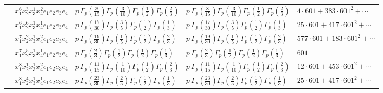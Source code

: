 \documentclass[11pt]{article}
\begin{document}
\begin{table}[ht]
{\begin{tabular}{@{}lllll@{}}
 & $x_{1}^{6} x_{2}^{3} x_{3}^{1} x_{4}^{2}  e_{1} e_{2} e_{3} e_{4}$ & $p \, \Gamma_p \left( \frac{8}{15} \right) \Gamma_p \left( \frac{3}{10} \right) \Gamma_p \left( \frac{1}{2} \right) \Gamma_p \left( \frac{2}{3} \right)$ & $p \, \Gamma_p \left( \frac{8}{15} \right) \Gamma_p \left( \frac{3}{10} \right) \Gamma_p \left( \frac{1}{2} \right) \Gamma_p \left( \frac{2}{3} \right)$ & $4{\cdot}601{+}383{\cdot}601^{2}{+}\cdots$ \\
 & $x_{1}^{6} x_{2}^{6} x_{3}^{1} x_{4}^{1}  e_{1} e_{2} e_{3} e_{4}$ & $p \, \Gamma_p \left( \frac{17}{30} \right) \Gamma_p \left( \frac{3}{5} \right) \Gamma_p \left( \frac{1}{2} \right) \Gamma_p \left( \frac{1}{3} \right)$ & $p \, \Gamma_p \left( \frac{17}{30} \right) \Gamma_p \left( \frac{3}{5} \right) \Gamma_p \left( \frac{1}{2} \right) \Gamma_p \left( \frac{1}{3} \right)$ & $25{\cdot}601{+}417{\cdot}601^{2}{+}\cdots$ \\
 & $x_{1}^{7} x_{2}^{2} x_{3}^{1} x_{4}^{2}  e_{1} e_{2} e_{3} e_{4}$ & $p \, \Gamma_p \left( \frac{19}{30} \right) \Gamma_p \left( \frac{1}{5} \right) \Gamma_p \left( \frac{1}{2} \right) \Gamma_p \left( \frac{2}{3} \right)$ & $p \, \Gamma_p \left( \frac{19}{30} \right) \Gamma_p \left( \frac{1}{5} \right) \Gamma_p \left( \frac{1}{2} \right) \Gamma_p \left( \frac{2}{3} \right)$ & $577{\cdot}601{+}183{\cdot}601^{2}{+}\cdots$ \\
 & $x_{1}^{7} x_{2}^{5} x_{3}^{1} x_{4}^{1}  e_{1} e_{2} e_{3} e_{4}$ & $p \, \Gamma_p \left( \frac{2}{3} \right) \Gamma_p \left( \frac{1}{2} \right) \Gamma_p \left( \frac{1}{2} \right) \Gamma_p \left( \frac{1}{3} \right)$ & $p \, \Gamma_p \left( \frac{2}{3} \right) \Gamma_p \left( \frac{1}{2} \right) \Gamma_p \left( \frac{1}{2} \right) \Gamma_p \left( \frac{1}{3} \right)$ & $601$ \\
 & $x_{1}^{8} x_{2}^{1} x_{3}^{1} x_{4}^{2}  e_{1} e_{2} e_{3} e_{4}$ & $p \, \Gamma_p \left( \frac{11}{15} \right) \Gamma_p \left( \frac{1}{10} \right) \Gamma_p \left( \frac{1}{2} \right) \Gamma_p \left( \frac{2}{3} \right)$ & $p \, \Gamma_p \left( \frac{11}{15} \right) \Gamma_p \left( \frac{1}{10} \right) \Gamma_p \left( \frac{1}{2} \right) \Gamma_p \left( \frac{2}{3} \right)$ & $12{\cdot}601{+}453{\cdot}601^{2}{+}\cdots$ \\
 & $x_{1}^{8} x_{2}^{4} x_{3}^{1} x_{4}^{1}  e_{1} e_{2} e_{3} e_{4}$ & $p \, \Gamma_p \left( \frac{23}{30} \right) \Gamma_p \left( \frac{2}{5} \right) \Gamma_p \left( \frac{1}{2} \right) \Gamma_p \left( \frac{1}{3} \right)$ & $p \, \Gamma_p \left( \frac{23}{30} \right) \Gamma_p \left( \frac{2}{5} \right) \Gamma_p \left( \frac{1}{2} \right) \Gamma_p \left( \frac{1}{3} \right)$ & $25{\cdot}601{+}417{\cdot}601^{2}{+}\cdots$ \\

\end{tabular}}
\end{table}
\end{document}

